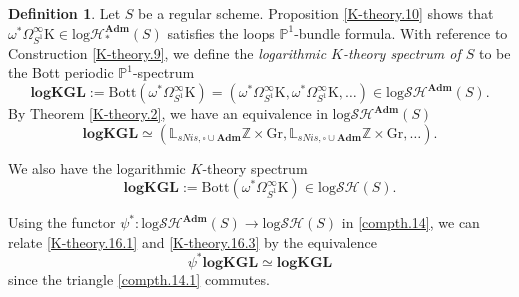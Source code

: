 \documentclass[11pt, a4paper]{amsart}
\theoremstyle{definition}
\newtheorem{df}[thm]{Definition}
\numberwithin{equation}{subsection}
\newcommand{\Z}{\mathbb{Z}}
\renewcommand{\P}{\mathbb{P}}
\newcommand{\bbL}{\mathbb{L}}
\newcommand{\Gr}{{\mathrm{Gr}}}
\newcommand{\Adm}{\mathbf{Adm}}
\newcommand{\Kth}{\mathrm{K}}
\newcommand{\Bott}{\mathrm{Bott}}
\newcommand{\logKGL}{\mathbf{logKGL}}
\newcommand{\boxx}{\square}
\newcommand{\inflogHpt}{\mathrm{log}\mathcal{H}_\ast}
\newcommand{\inflogSH}{\mathrm{log}\mathcal{SH}}
\begin{document}
\begin{df}
\label{K-theory.16}
Let $S$ be a regular scheme. 
Proposition \ref{K-theory.10} shows that 
$\omega^*\Omega_{S^1}^\infty \Kth \in \inflogHpt^\Adm(S)$ satisfies the loops $\P^1$-bundle formula.
With reference to Construction \ref{K-theory.9}, 
we define the \emph{logarithmic $K$-theory spectrum of $S$}  to be the 
Bott periodic $\P^1$-spectrum
\begin{equation}
\label{K-theory.16.1}
\logKGL:=\Bott(\omega^*\Omega_{S^1}^\infty \Kth)=(\omega^*\Omega_{S^1}^\infty \Kth,\omega^*\Omega_{S^1}^\infty 
\Kth,\ldots)\in \inflogSH^\Adm(S).
\end{equation}
\index[notation]{logKGL @ $\logKGL$}
By Theorem \ref{K-theory.2},
we have an equivalence in $\inflogSH^{\Adm}(S)$
\begin{equation}
\label{K-theory.16.2}
\logKGL
\simeq
(\bbL_{sNis,\boxx\cup \Adm}\Z\times \Gr,\bbL_{sNis,\boxx\cup \Adm}\Z\times \Gr,\ldots).
\end{equation}

We also have the logarithmic $K$-theory spectrum
\begin{equation}
\label{K-theory.16.3}
\logKGL
:=
\Bott(\omega^*\Omega_{S^1}^\infty \Kth)\in \inflogSH(S).
\end{equation}

Using the functor $\psi^*\colon \inflogSH^\Adm(S)\to \inflogSH(S)$ in \ref{compth.14},
we can relate \eqref{K-theory.16.1} and \eqref{K-theory.16.3} by the equivalence
\begin{equation}
\psi^*\logKGL
\simeq
\logKGL
\end{equation}
since the triangle \eqref{compth.14.1} commutes.
\end{df}
\end{document}
